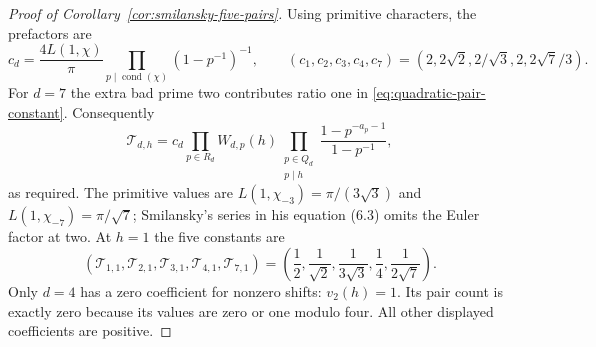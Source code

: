 \begin{proof}[Proof of Corollary~\ref{cor:smilansky-five-pairs}]
Using primitive characters, the prefactors are
\[
 c_d=\frac{4L(1,\chi)}\pi
                 \prod_{p\mid\operatorname{cond}(\chi)}(1-p^{-1})^{-1},
 \qquad
 (c_1,c_2,c_3,c_4,c_7)
       =(2,2\sqrt2,2/\sqrt3,2,2\sqrt7/3).
\]
For \(d=7\) the extra bad prime two contributes ratio one
in \eqref{eq:quadratic-pair-constant}. Consequently
\[
 \mathscr T_{d,h}=c_d\prod_{p\in R_d}W_{d,p}(h)
        \prod_{\substack{p\in Q_d\\p\mid h}}
                    \frac{1-p^{-a_p-1}}{1-p^{-1}},
\]
as required. The primitive values are
\(L(1,\chi_{-3})=\pi/(3\sqrt3)\) and
\(L(1,\chi_{-7})=\pi/\sqrt7\); Smilansky's series in
his equation (6.3) omits the Euler factor at two.
At \(h=1\) the five constants are
\[
 (\mathscr T_{1,1},\mathscr T_{2,1},\mathscr T_{3,1},
      \mathscr T_{4,1},\mathscr T_{7,1})
   =\left(\frac12,\frac1{\sqrt2},\frac1{3\sqrt3},
                        \frac14,\frac1{2\sqrt7}\right).
\]
Only \(d=4\) has a zero coefficient for nonzero shifts:
\(v_2(h)=1\). Its pair count is exactly zero because its
values are zero or one modulo four. All other displayed
coefficients are positive.
\end{proof}
